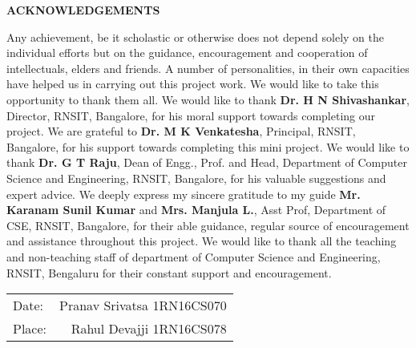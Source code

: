 \thispagestyle{empty}
\begin{center}
\textup{\large{\textbf{ACKNOWLEDGEMENTS}}} \\[0.1in]
\end{center}

\justify
\indent
Any achievement, be it scholastic or otherwise does not depend solely on the individual efforts but on the guidance, encouragement and cooperation of intellectuals, elders and friends. A number of personalities, in their own capacities have helped us in carrying out this project work. We would like to take this opportunity to thank them all.
We would like to thank \textbf{Dr. H N Shivashankar}, Director, RNSIT, Bangalore, for his moral support towards completing our project.
We are grateful to \textbf{Dr. M K Venkatesha}, Principal, RNSIT, Bangalore, for his support towards completing this mini project.
We would like to thank \textbf{Dr. G T Raju}, Dean of Engg., Prof. and Head, Department of Computer Science and Engineering, RNSIT, Bangalore, for his valuable suggestions and expert advice.
We deeply express my sincere gratitude to my guide \textbf{Mr. Karanam Sunil Kumar} and \textbf{Mrs. Manjula L.}, Asst Prof, Department of CSE, RNSIT, Bangalore, for their able guidance, regular source of encouragement and assistance throughout this project.
We would like to thank all the teaching and non-teaching staff of department of Computer Science and Engineering, RNSIT, Bengaluru for their constant support and encouragement.\\[5in]
\justify
\begin{tabular}{l r}
\textup{Date:} & \hspace{9cm}\textup{Pranav Srivatsa 1RN16CS070}\\
\textup{Place:} & \hspace{9cm}\textup{Rahul Devajji 1RN16CS078}
\end{tabular}


\pagebreak
